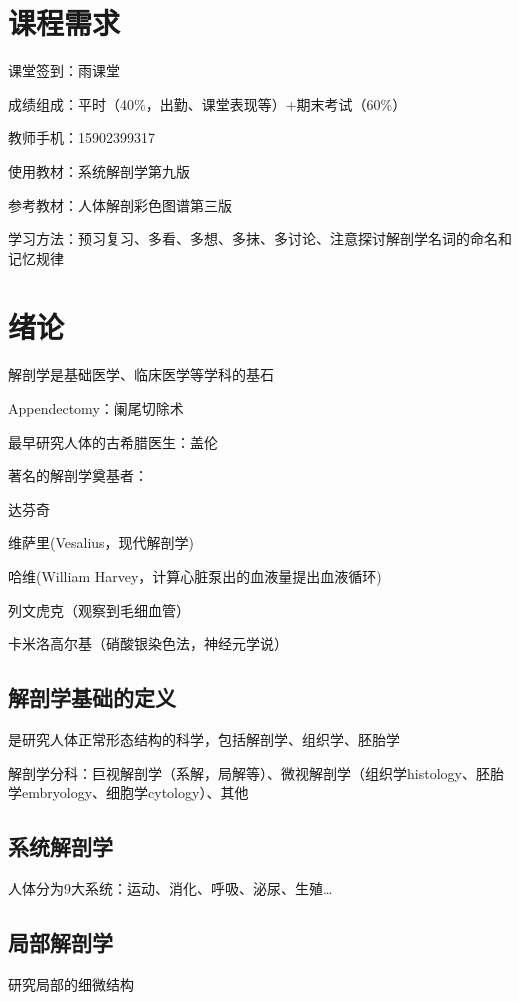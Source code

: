 \section*{课程需求}%
\label{sec:课程需求}
课堂签到：雨课堂

成绩组成：平时（40\%，出勤、课堂表现等）+期末考试（60\%）

教师手机：15902399317

使用教材：系统解剖学第九版

参考教材：人体解剖彩色图谱第三版

学习方法：预习复习、多看、多想、多抹、多讨论、注意探讨解剖学名词的命名和记忆规律
\section{绪论}%
\label{sec:绪论}
解剖学是基础医学、临床医学等学科的基石
\begin{notation}
    Appendectomy：阑尾切除术
\end{notation}
\begin{notation}
    最早研究人体的古希腊医生：盖伦
\end{notation}
\begin{notation}
    著名的解剖学奠基者：

    达芬奇
    
    维萨里(Vesalius，现代解剖学)
    
    哈维(William Harvey，计算心脏泵出的血液量提出血液循环)
    
    列文虎克（观察到毛细血管）
    
    卡米洛高尔基（硝酸银染色法，神经元学说）
\end{notation}
\subsection{解剖学基础的定义}%
\label{sub:解剖学基础的定义}
是研究人体正常形态结构的科学，包括解剖学、组织学、胚胎学

解剖学分科：巨视解剖学（系解，局解等）、微视解剖学（组织学histology、胚胎学embryology、细胞学cytology）、其他

\subsection*{系统解剖学}%
\label{sub:系统解剖学}
人体分为9大系统：运动、消化、呼吸、泌尿、生殖\ldots
\subsection*{局部解剖学}%
\label{sub:局部解剖学}
研究局部的细微结构

